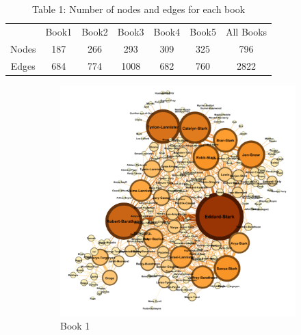 \documentclass[12pt, a4paper]{article}
\begin{document}
\begin{table}[H]
    \centering
    \begin{tabular}{c|c|c|c|c|c|c}
    \hline
         & Book1 & Book2 & Book3 & Book4 & Book5 & All Books\\
        Nodes & 187 & 266 & 293 & 309 & 325 & 796\\
        Edges & 684 & 774 & 1008 & 682 & 760 & 2822\\
    \hline
    \end{tabular}
    \caption{Table 1: Number of nodes and edges for each book}
    \label{tab:my_label}
\end{table}

\begin{figure}[H]
\centering
\begin{subfigure}{.5\textwidth}
  \centering
  \includegraphics[width=1\linewidth]{book_1.png}
  \caption{Book 1}
  \label{fig:sub1}
\end{subfigure}%
\begin{subfigure}{.5\textwidth}
  \centering

\end{subfigure}
\end{figure}
\end{document}
